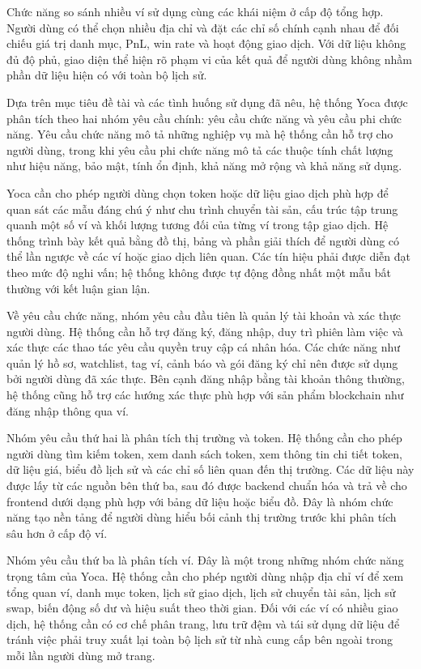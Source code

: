 Chức năng so sánh nhiều ví sử dụng cùng các khái niệm ở cấp độ tổng hợp. Người dùng có thể chọn nhiều địa chỉ và đặt các chỉ số chính cạnh nhau để đối chiếu giá trị danh mục, PnL, win rate và hoạt động giao dịch. Với dữ liệu không đủ độ phủ, giao diện thể hiện rõ phạm vi của kết quả để người dùng không nhầm phần dữ liệu hiện có với toàn bộ lịch sử.

Dựa trên mục tiêu đề tài và các tình huống sử dụng đã nêu, hệ thống Yoca được phân tích theo hai nhóm yêu cầu chính: yêu cầu chức năng và yêu cầu phi chức năng. Yêu cầu chức năng mô tả những nghiệp vụ mà hệ thống cần hỗ trợ cho người dùng, trong khi yêu cầu phi chức năng mô tả các thuộc tính chất lượng như hiệu năng, bảo mật, tính ổn định, khả năng mở rộng và khả năng sử dụng.

Yoca cần cho phép người dùng chọn token hoặc dữ liệu giao dịch phù hợp để quan sát các mẫu đáng chú ý như chu trình chuyển tài sản, cấu trúc tập trung quanh một số ví và khối lượng tương đối của từng ví trong tập giao dịch. Hệ thống trình bày kết quả bằng đồ thị, bảng và phần giải thích để người dùng có thể lần ngược về các ví hoặc giao dịch liên quan. Các tín hiệu phải được diễn đạt theo mức độ nghi vấn; hệ thống không được tự động đồng nhất một mẫu bất thường với kết luận gian lận.

Về yêu cầu chức năng, nhóm yêu cầu đầu tiên là quản lý tài khoản và xác thực người dùng. Hệ thống cần hỗ trợ đăng ký, đăng nhập, duy trì phiên làm việc và xác thực các thao tác yêu cầu quyền truy cập cá nhân hóa. Các chức năng như quản lý hồ sơ, watchlist, tag ví, cảnh báo và gói đăng ký chỉ nên được sử dụng bởi người dùng đã xác thực. Bên cạnh đăng nhập bằng tài khoản thông thường, hệ thống cũng hỗ trợ các hướng xác thực phù hợp với sản phẩm blockchain như đăng nhập thông qua ví.

Nhóm yêu cầu thứ hai là phân tích thị trường và token. Hệ thống cần cho phép người dùng tìm kiếm token, xem danh sách token, xem thông tin chi tiết token, dữ liệu giá, biểu đồ lịch sử và các chỉ số liên quan đến thị trường. Các dữ liệu này được lấy từ các nguồn bên thứ ba, sau đó được backend chuẩn hóa và trả về cho frontend dưới dạng phù hợp với bảng dữ liệu hoặc biểu đồ. Đây là nhóm chức năng tạo nền tảng để người dùng hiểu bối cảnh thị trường trước khi phân tích sâu hơn ở cấp độ ví.

Nhóm yêu cầu thứ ba là phân tích ví. Đây là một trong những nhóm chức năng trọng tâm của Yoca. Hệ thống cần cho phép người dùng nhập địa chỉ ví để xem tổng quan ví, danh mục token, lịch sử giao dịch, lịch sử chuyển tài sản, lịch sử swap, biến động số dư và hiệu suất theo thời gian. Đối với các ví có nhiều giao dịch, hệ thống cần có cơ chế phân trang, lưu trữ đệm và tái sử dụng dữ liệu để tránh việc phải truy xuất lại toàn bộ lịch sử từ nhà cung cấp bên ngoài trong mỗi lần người dùng mở trang.


